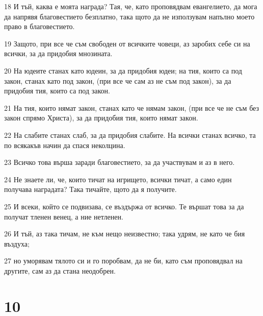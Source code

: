 \par 18 И тъй, каква е моята награда? Тая, че, като проповядвам евангелието, да мога да напрявя благовестието безплатно, така щото да не използувам напълно моето право в благовестието.
\par 19 Защото, при все че съм свободен от всичките човеци, аз заробих себе си на всички, за да придобия мнозината.
\par 20 На юдеите станах като юдеин, за да придобия юдеи; на тия, които са под закон, станах като под закон, (при все че сам аз не съм под закон), за да придобия тия, които са под закон.
\par 21 На тия, които нямат закон, станах като че нямам закон, (при все че не съм без закон спрямо Христа), за да придобия тия, които нямат закон.
\par 22 На слабите станах слаб, за да придобия слабите. На всички станах всичко, та по всякакъв начин да спася неколцина.
\par 23 Всичко това върша заради благовестието, за да участвувам и аз в него.
\par 24 Не знаете ли, че, които тичат на игрището, всички тичат, а само един получава наградата? Така тичайте, щото да я получите.
\par 25 И всеки, който се подвизава, се въздържа от всичко. Те вършат това за да получат тленен венец, а ние нетленен.
\par 26 И тъй, аз така тичам, не към нещо неизвестно; така удрям, не като че бия въздуха;
\par 27 но уморявам тялото си и го поробвам, да не би, като съм проповядвал на другите, сам аз да стана неодобрен.

\chapter{10}

